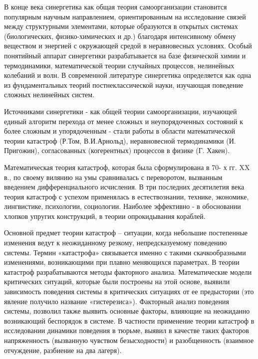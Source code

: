 \documentclass[exam_answers.tex]{subfiles}
\begin{document}
В конце века синергетика как общая теория самоорганизации становится
популярным научным направлением, ориентированным на исследование связей
между структурными элементами, которые образуются в открытых системах
(биологических, физико-химических и др.) благодаря интенсивному обмену
веществом и энергией с окружающей средой в неравновесных условиях.
Особый понятийный аппарат синергетики разрабатывается на базе физической
химии и термодинамики, математической теории случайных процессов,
нелинейных колебаний и волн. В современной литературе синергетика
определяется как одна из фундаментальных теорий постнеклассической науки,
изучающая поведение сложных нелинейных систем.

Источниками синергетики - как общей теории самоорганизации,
изучающей единый алгоритм перехода от менее сложных и неупорядоченных
состояний к более сложным и упорядоченным - стали работы в области
математической теории катастроф (Р.Том, В.И.Арнольд), неравновесной
термодинамики (И. Пригожин), согласованных (когерентных) процессов в
физике (Г. Хакен).

Математическая теория катастроф, которая была сформулирована в 70-
х гг. XX в., по своему вилянию на умы сравнивалась с переворотом, вызванным
введением дифференциального исчисления. В три последних десятилетия века
теория катастроф с успехом применялась в естествознании, технике,
экономике, лингвистике, психологии, социологии. Наиболее эффективно - в
обосновании хлопков упругих конструкций, в теории опрокидывания кораблей. 

Основной предмет теории катастроф – ситуации, когда небольшие
постепенные изменения ведут к неожиданному резкому, непредсказуемому
поведению системы. Термин «катастрофа» связывается именно с такими
скачкообразными изменениями, возникающими при плавно меняющихся
параметрах. В теории катастроф разрабатываются методы факторного анализа.
Математические модели критических ситуаций, которые были построены на
этой основе, выявили зависимость поведения системы в критических ситуациях
от ее предыстории (это явление получило название «гистерезиса»). Факторный
анализ поведения системы, позволил также выявить основные факторы,
влияющие на неожиданно возникающий беспорядок в системе. В частности
применение теории катастроф в исследовании динамики поведения в тюрьме,
выявил в качестве таких факторов напряженность (вызванную чувством
безысходности) и разобщенность (взаимное отчуждение, разбиение на два
лагеря).
\end{document}
